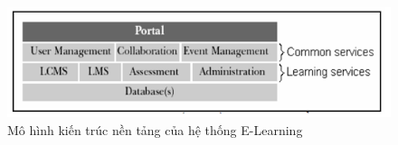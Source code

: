 \begin{center}
	\begin{figure}[htp]
		\begin{center}
			\includegraphics[width=15cm]{Chapter2/Pictures/picture21.png}
		\end{center}
		\caption{Mô hình kiến trúc nền tảng của hệ thống E-Learning}
		\label{refpicture21}
	\end{figure}
\end{center}

